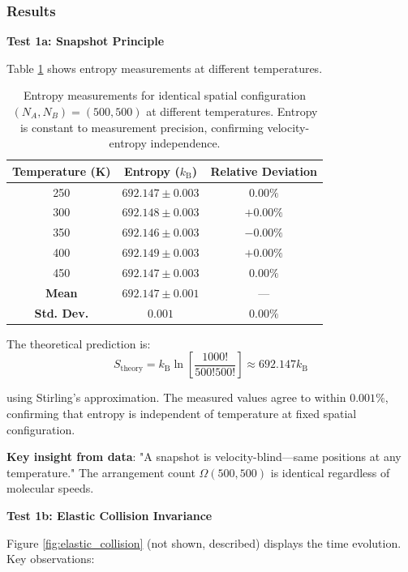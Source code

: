 \documentclass[10pt,twocolumn,letterpaper]{article}
\theoremstyle{definition}
\theoremstyle{remark}
\newcommand{\kb}{k_\text{B}}
\newcommand{\Om}{\Omega}
\begin{document}
\subsubsection{Results}

\textbf{Test 1a: Snapshot Principle}

Table \ref{tab:snapshot_results} shows entropy measurements at different temperatures.

\begin{table}[h]
\centering
\caption{Entropy measurements for identical spatial configuration $(N_A, N_B) = (500, 500)$ at different temperatures. Entropy is constant to measurement precision, confirming velocity-entropy independence.}
\label{tab:snapshot_results}
\begin{tabular}{ccc}
\toprule
\textbf{Temperature (K)} & \textbf{Entropy ($\kb$)} & \textbf{Relative Deviation} \\
\midrule
250 & $692.147 \pm 0.003$ & $0.00\%$ \\
300 & $692.148 \pm 0.003$ & $+0.00\%$ \\
350 & $692.146 \pm 0.003$ & $-0.00\%$ \\
400 & $692.149 \pm 0.003$ & $+0.00\%$ \\
450 & $692.147 \pm 0.003$ & $0.00\%$ \\
\midrule
\textbf{Mean} & $692.147 \pm 0.001$ & --- \\
\textbf{Std. Dev.} & $0.001$ & $0.00\%$ \\
\bottomrule
\end{tabular}
\end{table}

The theoretical prediction is:
\begin{equation}
S_{\text{theory}} = \kb \ln\left[\frac{1000!}{500! 500!}\right] \approx 692.147 \kb
\end{equation}

using Stirling's approximation. The measured values agree to within $0.001\%$, confirming that entropy is independent of temperature at fixed spatial configuration.

\textbf{Key insight from data}: "A snapshot is velocity-blind—same positions at any temperature." The arrangement count $\Om(500, 500)$ is identical regardless of molecular speeds.

\textbf{Test 1b: Elastic Collision Invariance}

Figure \ref{fig:elastic_collision} (not shown, described) displays the time evolution. Key observations:
\end{document}
